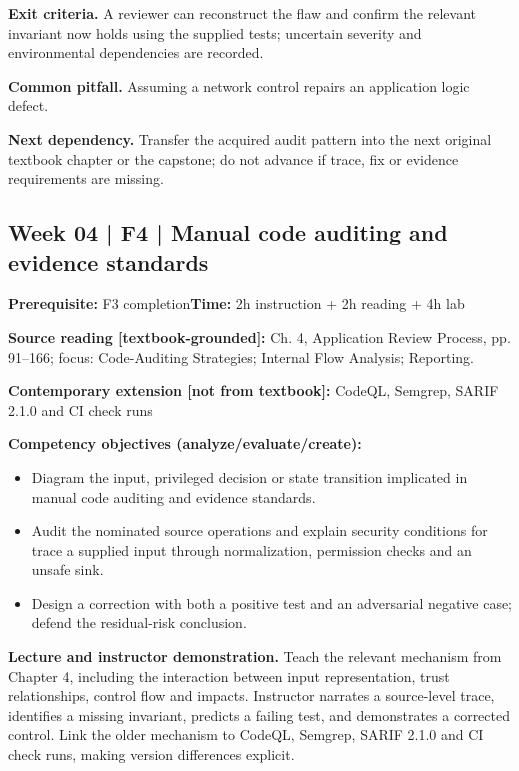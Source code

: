 \documentclass[10pt,letterpaper]{article}
\begin{document}
\textbf{Exit criteria.} A reviewer can reconstruct the flaw and confirm the relevant invariant now holds using the supplied tests; uncertain severity and environmental dependencies are recorded.

\textbf{Common pitfall.} Assuming a network control repairs an application logic defect.

\textbf{Next dependency.} Transfer the acquired audit pattern into the next original textbook chapter or the capstone; do not advance if trace, fix or evidence requirements are missing.

\subsection{Week 04 | F4 | Manual code auditing and evidence standards}
\textbf{Prerequisite:} F3 completion\hfill\textbf{Time:} 2h instruction + 2h reading + 4h lab

\textbf{Source reading [textbook-grounded]:} Ch. 4, Application Review Process, pp. 91--166; focus: Code-Auditing Strategies; Internal Flow Analysis; Reporting.

\textbf{Contemporary extension [not from textbook]:} CodeQL, Semgrep, SARIF 2.1.0 and CI check runs

\textbf{Competency objectives (analyze/evaluate/create):}
\begin{itemize}[leftmargin=*,itemsep=2pt]
\item Diagram the input, privileged decision or state transition implicated in manual code auditing and evidence standards.
\item Audit the nominated source operations and explain security conditions for trace a supplied input through normalization, permission checks and an unsafe sink.
\item Design a correction with both a positive test and an adversarial negative case; defend the residual-risk conclusion.
\end{itemize}
\textbf{Lecture and instructor demonstration.} Teach the relevant mechanism from Chapter 4, including the interaction between input representation, trust relationships, control flow and impacts. Instructor narrates a source-level trace, identifies a missing invariant, predicts a failing test, and demonstrates a corrected control. Link the older mechanism to CodeQL, Semgrep, SARIF 2.1.0 and CI check runs, making version differences explicit.
\end{document}

